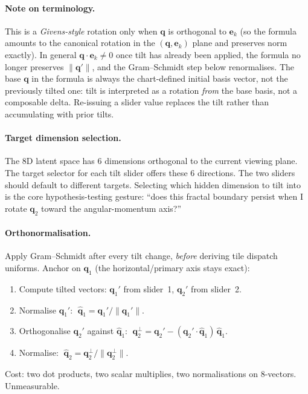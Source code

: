 \documentclass[11pt]{report}
\begin{document}
\paragraph{Note on terminology.} This is a \emph{Givens-style} rotation only when $\mathbf q$ is orthogonal to $\mathbf e_k$ (so the formula amounts to the canonical rotation in the $(\mathbf q,\mathbf e_k)$ plane and preserves norm exactly). In general $\mathbf q\cdot\mathbf e_k\ne 0$ once tilt has already been applied, the formula no longer preserves $\|\mathbf q'\|$, and the Gram--Schmidt step below renormalises. The base $\mathbf q$ in the formula is always the chart-defined initial basis vector, not the previously tilted one: tilt is interpreted as a rotation \emph{from} the base basis, not a composable delta. Re-issuing a slider value replaces the tilt rather than accumulating with prior tilts.

\paragraph{Target dimension selection.} The 8D latent space has 6 dimensions orthogonal to the current viewing plane. The target selector for each tilt slider offers these 6 directions. The two sliders should default to different targets. Selecting which hidden dimension to tilt into is the core hypothesis-testing gesture: ``does this fractal boundary persist when I rotate $\mathbf q_2$ toward the angular-momentum axis?''

\paragraph{Orthonormalisation.} Apply Gram--Schmidt after every tilt change, \emph{before} deriving tile dispatch uniforms. Anchor on $\mathbf q_1$ (the horizontal/primary axis stays exact):
\begin{enumerate}[nosep]
\item Compute tilted vectors: $\mathbf q_1'$ from slider~1, $\mathbf q_2'$ from slider~2.
\item Normalise $\mathbf q_1'$: $\;\hat{\mathbf q}_1 = \mathbf q_1'/\|\mathbf q_1'\|$.
\item Orthogonalise $\mathbf q_2'$ against $\hat{\mathbf q}_1$: $\;\mathbf q_2^\perp = \mathbf q_2' - (\mathbf q_2'\cdot\hat{\mathbf q}_1)\,\hat{\mathbf q}_1$.
\item Normalise: $\;\hat{\mathbf q}_2 = \mathbf q_2^\perp / \|\mathbf q_2^\perp\|$.
\end{enumerate}
Cost: two dot products, two scalar multiplies, two normalisations on 8-vectors. Unmeasurable.
\end{document}
